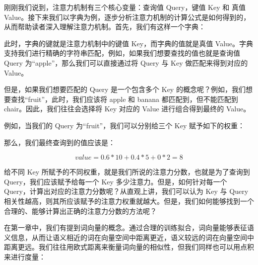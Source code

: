 \documentclass[12pt,a4paper]{book}
\begin{document}
刚刚我们说到，注意力机制有三个核心变量：查询值 Query，键值 Key 和 真值
Value。接下来我们以字典为例，逐步分析注意力机制的计算公式是如何得到的，从而帮助读者深入理解注意力机制。首先，我们有这样一个字典：

\begin{Shaded}
\begin{Highlighting}[]
\FunctionTok{\{}
    \FunctionTok{:}\FunctionTok{,}
    \FunctionTok{:}\FunctionTok{,}
    \FunctionTok{:}
\FunctionTok{\}}
\end{Highlighting}
\end{Shaded}

此时，字典的键就是注意力机制中的键值 Key，而字典的值就是真值
Value。字典支持我们进行精确的字符串匹配，例如，如果我们想要查找的值也就是查询值
Query 为``apple''，那么我们可以直接通过将 Query 与 Key
做匹配来得到对应的 Value。

但是，如果我们想要匹配的 Query 是一个包含多个 Key
的概念呢？例如，我们想要查找``fruit''，此时，我们应该将 apple 和 banana
都匹配到，但不能匹配到 chair。因此，我们往往会选择将 Key 对应的 Value
进行组合得到最终的 Value。

例如，当我们的 Query 为``fruit''，我们可以分别给三个 Key
赋予如下的权重：

\begin{Shaded}
\begin{Highlighting}[]
\FunctionTok{\{}
    \FunctionTok{:}\FunctionTok{,}
    \FunctionTok{:}\FunctionTok{,}
    \FunctionTok{:}
\FunctionTok{\}}
\end{Highlighting}
\end{Shaded}

那么，我们最终查询到的值应该是：

\[
value = 0.6 * 10 + 0.4 * 5 + 0 * 2 = 8
\]

给不同 Key 所赋予的不同权重，就是我们所说的注意力分数，也就是为了查询到
Query，我们应该赋予给每一个 Key 多少注意力。但是，如何针对每一个
Query，计算出对应的注意力分数呢？从直观上讲，我们可以认为 Key 与 Query
相关性越高，则其所应该赋予的注意力权重就越大。但是，我们如何能够找到一个合理的、能够计算出正确的注意力分数的方法呢？

在第一章中，我们有提到词向量的概念。通过合理的训练拟合，词向量能够表征语义信息，从而让语义相近的词在向量空间中距离更近，语义较远的词在向量空间中距离更远。我们往往用欧式距离来衡量词向量的相似性，但我们同样也可以用点积来进行度量：
\end{document}
